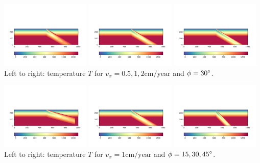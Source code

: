 \begin{center}
\includegraphics[width=0.32\textwidth]{images/mckenzie/temperature2_vel0p5_phi30.pdf}
\includegraphics[width=0.32\textwidth]{images/mckenzie/temperature2_vel1_phi30.pdf}
\includegraphics[width=0.32\textwidth]{images/mckenzie/temperature2_vel2_phi30.pdf}\\
{\captionfont Left to right: temperature $T$ for $v_x={0.5,1,2}\text{cm/year}$ and $\phi=30\degree$.}
\end{center}

\begin{center}
\includegraphics[width=0.32\textwidth]{images/mckenzie/temperature2_vel1_phi15.pdf}
\includegraphics[width=0.32\textwidth]{images/mckenzie/temperature2_vel1_phi30.pdf}
\includegraphics[width=0.32\textwidth]{images/mckenzie/temperature2_vel1_phi45.pdf}\\
{\captionfont Left to right: temperature $T$ for $v_x=1\text{cm/year}$ and $\phi={15,30,45}\degree$.}
\end{center}




